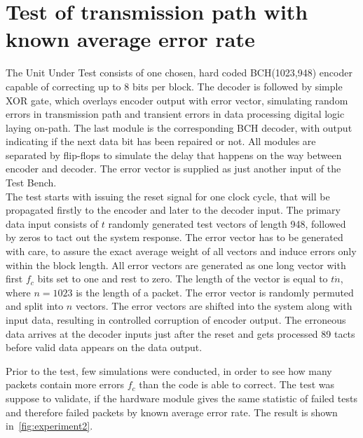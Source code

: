 \section{Test of transmission path with known average error rate}
The Unit Under Test consists of one chosen, hard coded BCH(1023,948) encoder capable of correcting up to 8 bits per block. The decoder is followed by simple XOR gate, which overlays encoder output with error vector, simulating random errors in transmission path and transient errors in data processing digital logic laying on-path. The last module is the corresponding BCH decoder, with output indicating if the next data bit has been repaired or not. All modules are separated by flip-flops to simulate the delay that happens on the way between encoder and decoder. The error vector is supplied as just another input of the Test Bench.\\

The test starts with issuing the reset signal for one clock cycle, that will be propagated firstly to the encoder and later to the decoder input. The primary data input consists of $t$ randomly generated test vectors of length 948, followed by zeros to tact out the system response. The error vector has to be generated with care, to assure the exact average weight of all vectors and induce errors only within the block length. All error vectors are generated as one long vector with first $f_c$ bits set to one and rest to zero. The length of the vector is equal to $t\dot n$, where $n=1023$ is the length of a packet. The error vector is randomly permuted and split into $n$ vectors. The error vectors are shifted into the system along with input data, resulting in controlled corruption of encoder output. The erroneous data arrives at the decoder inputs just after the reset and gets processed 89 tacts before valid data appears on the data output. 

Prior to the test, few simulations were conducted, in order to see how many packets contain more errors $f_c$ than the code is able to correct. The test was suppose to validate, if the hardware module gives the same statistic of failed tests and therefore failed packets by known average error rate. The result is shown in~\autoref{fig:experiment2}.



